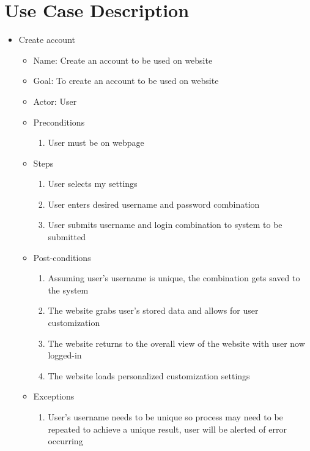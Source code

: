 \section{Use Case Description}
\begin{itemize}
\item Create account
	\begin{itemize}
	\item Name: Create an account to be used on website
    \item Goal: To create an account to be used on website
    \item Actor: User
    \item Preconditions
		\begin{enumerate}
		\item User must be on webpage
        \end{enumerate}
    \item Steps
    	\begin{enumerate}
		\item User selects my settings
        \item User enters desired username and password combination
        \item User submits username and login combination to system to be submitted
        \end{enumerate}
    \item Post-conditions
		\begin{enumerate}
		\item Assuming user's username is unique, the combination gets saved to the system
        \item The website grabs user's stored data and allows for user customization 
        \item The website returns to the overall view of the website with user now logged-in
        \item The website loads personalized customization settings
        \end{enumerate}
    \item Exceptions
    	\begin{enumerate} 
    	\item User's username needs to be unique so process may need to be repeated to achieve a unique result, user will be alerted of error occurring 
        \end{enumerate}
    \end{itemize}


\end{itemize}
